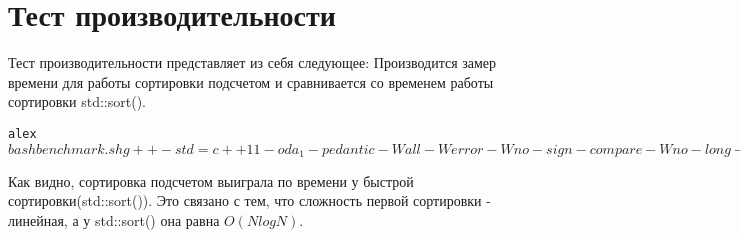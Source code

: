 \section{Тест производительности}

Тест производительности представляет из себя следующее: Производится замер времени для работы сортировки подсчетом и сравнивается со временем работы сортировки std::sort().

\begin{alltt}
alex$ bash benchmark.sh 
g++ -std=c++11 -o da_1 -pedantic -Wall -Werror -Wno-sign-compare -Wno-long-long -lm main.cpp sort.cpp 
Time for Radix Sort

real	0m20.225s
user	0m19.748s
sys		0m0.472s
Time for std::sort()

real	0m28.851s
user	0m27.836s
sys		0m1.000s
alex$
\end{alltt}
Как видно, сортировка подсчетом выиграла по времени у быстрой сортировки(std::sort()). Это связано с тем, что сложность первой сортировки - линейная, а у std::sort() она равна $O(NlogN)$.

\pagebreak
